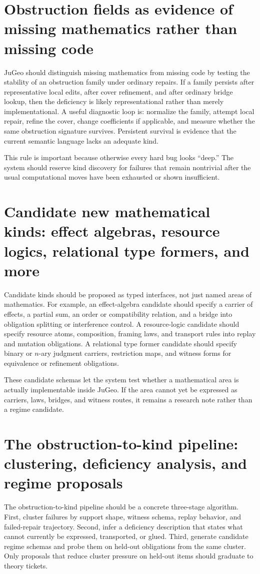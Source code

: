 \documentclass[11pt]{report}
\begin{document}
\section{Obstruction fields as evidence of missing mathematics rather than missing code}
JuGeo should distinguish missing mathematics from missing code by testing the stability of an obstruction family under ordinary repairs. If a family persists after representative local edits, after cover refinement, and after ordinary bridge lookup, then the deficiency is likely representational rather than merely implementational. A useful diagnostic loop is: normalize the family, attempt local repair, refine the cover, change coefficients if applicable, and measure whether the same obstruction signature survives. Persistent survival is evidence that the current semantic language lacks an adequate kind.

This rule is important because otherwise every hard bug looks “deep.” The system should reserve kind discovery for failures that remain nontrivial after the usual computational moves have been exhausted or shown insufficient.

\section{Candidate new mathematical kinds: effect algebras, resource logics, relational type formers, and more}
Candidate kinds should be proposed as typed interfaces, not just named areas of mathematics. For example, an effect-algebra candidate should specify a carrier of effects, a partial sum, an order or compatibility relation, and a bridge into obligation splitting or interference control. A resource-logic candidate should specify resource atoms, composition, framing laws, and transport rules into replay and mutation obligations. A relational type former candidate should specify binary or $n$-ary judgment carriers, restriction maps, and witness forms for equivalence or refinement obligations.

These candidate schemas let the system test whether a mathematical area is actually implementable inside JuGeo. If the area cannot yet be expressed as carriers, laws, bridges, and witness routes, it remains a research note rather than a regime candidate.

\section{The obstruction-to-kind pipeline: clustering, deficiency analysis, and regime proposals}
The obstruction-to-kind pipeline should be a concrete three-stage algorithm. First, cluster failures by support shape, witness schema, replay behavior, and failed-repair trajectory. Second, infer a deficiency description that states what cannot currently be expressed, transported, or glued. Third, generate candidate regime schemas and probe them on held-out obligations from the same cluster. Only proposals that reduce cluster pressure on held-out items should graduate to theory tickets.
\end{document}
